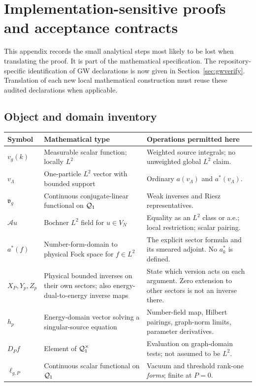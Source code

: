 \documentclass[11pt,a4paper]{article}
\theoremstyle{remark}\newtheorem{remark}[theorem]{Remark}
\begin{document}
\appendix
\section{Implementation-sensitive proofs and acceptance contracts}\label{app:domain}
This appendix records the small analytical steps most likely to be lost when translating the proof. It is part of the mathematical specification. The repository-specific identification of GW declarations is now given in Section~\ref{sec:gwverify}. Translation of each new local mathematical construction must reuse these audited declarations when applicable.

\subsection{Object and domain inventory}
\begin{longtable}{>{\raggedright\arraybackslash}p{}>{\raggedright\arraybackslash}p{}>{\raggedright\arraybackslash}p{}}
\toprule
Symbol & Mathematical type & Operations permitted here\\\midrule\endhead
$v_g(k)$ & Measurable scalar function; locally $L^2$ & Weighted source integrals; no unweighted global $L^2$ claim.\\
$v_\Lambda$ & One-particle $L^2$ vector with bounded support & Ordinary $a(v_\Lambda)$ and $a^*(v_\Lambda)$.\\
$\mathfrak v_g$ & Continuous conjugate-linear functional on $\mathcal Q_1$ & Weak inverses and Riesz representatives.\\
$\mathcal A u$ & Bochner $L^2$ field for $u\in V_N$ & Equality as an $L^2$ class or a.e.; local restriction; scalar pairing.\\
$a^*(f)$ & Number-form-domain to physical Fock space for $f\in L^2$ & The explicit sector formula and its smeared adjoint. No $a_k^*$ is defined.\\
$X_P,Y_p,Z_p$ & Physical bounded inverses on their own sectors; also energy-dual-to-energy inverse maps & State which version acts on each argument. Zero extension to other sectors is not an inverse there.\\
$h_p$ & Energy-domain vector solving a singular-source equation & Number-field map, Hilbert pairings, graph-norm limits, parameter derivatives.\\
$D_P f$ & Element of $\mathcal Q_1^{\times}$ & Evaluation on graph-domain tests; not assumed to be $L^2$.\\
$\ell_{g,P}$ & Continuous scalar functional on $\mathcal Q_1$ & Vacuum and threshold rank-one \emph{forms}; finite at $P=0$.\\

\end{longtable}
\end{document}
